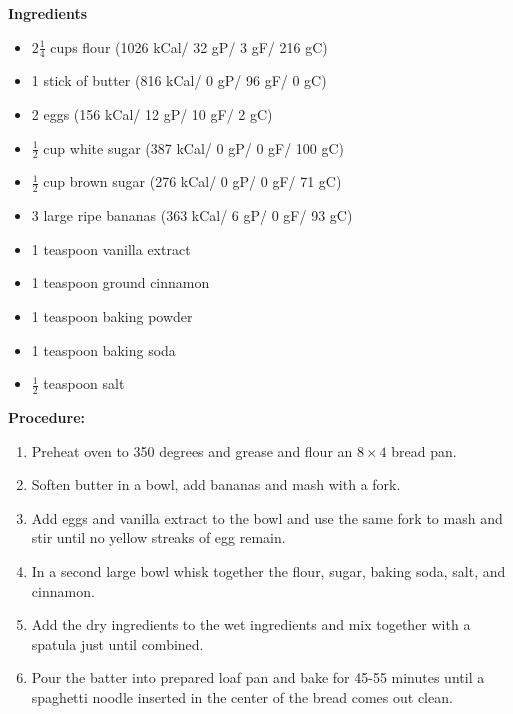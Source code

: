 \begin{multicols}{2}
\textbf{Ingredients}
\begin{itemize}
\item $2\frac{1}{4}$ cups flour \quad (1026 kCal/ 32 gP/ 3 gF/ 216 gC)
\item 1 stick of butter (816 kCal/ 0 gP/ 96 gF/ 0 gC)
\item 2 eggs  \quad (156 kCal/ 12 gP/ 10 gF/ 2 gC)
\item $\frac{1}{2}$ cup white sugar (387 kCal/ 0 gP/ 0 gF/ 100 gC)
\item $\frac{1}{2}$ cup brown sugar \quad (276 kCal/ 0 gP/ 0 gF/ 71 gC)
\item 3 large ripe bananas \quad (363 kCal/ 6 gP/ 0 gF/ 93 gC)
\item 1 teaspoon vanilla extract 
\item 1 teaspoon ground cinnamon
\item 1 teaspoon baking powder
\item 1 teaspoon baking soda 
\item $\frac{1}{2}$ teaspoon salt




\end{itemize}


\columnbreak
\textbf{Procedure:}
\medskip


\begin{enumerate}
\item Preheat oven to 350 degrees and grease and flour an $8\times4$ bread pan.

\item Soften butter in a bowl, add bananas and mash with a fork. 

\item Add eggs and vanilla extract to the bowl and use the same fork to mash and stir until no yellow streaks of egg remain.

\item In a second large bowl whisk together the flour, sugar, baking soda, salt, and cinnamon.

\item Add the dry ingredients to the wet ingredients and mix together with a spatula just until combined.

\item Pour the batter into prepared loaf pan and bake for 45-55 minutes until a spaghetti noodle inserted in the center of the bread comes out clean.


\end{enumerate}
\end{multicols}
